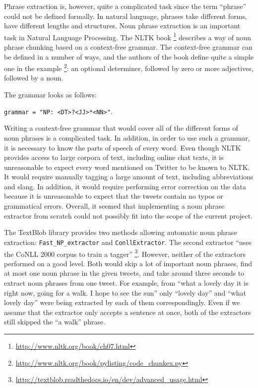 Phrase extraction is, however, quite a complicated task since the term ``phrase'' could not be defined formally. In natural language, phrases take different forms, have different lengths and structures. Noun phrase extraction is an important task in Natural Language Processing. The NLTK book \footnote{\url{http://www.nltk.org/book/ch07.html}} describes a way of noun phrase chunking based on a context-free grammar. The context-free grammar can be defined in a number of ways, and the authors of the book define quite a simple one in the example \footnote{\url{http://www.nltk.org/book/pylisting/code_chunkex.py}}: 
an optional determiner, followed by zero or more adjectives, followed by a noun. 

The grammar looks as follows: 

\texttt{grammar = "NP: {<DT>?<JJ>*<NN>}"}. 

Writing a context-free grammar that would cover all of the different forms of noun phrases is a complicated task. In addition, in order to use such a grammar, it is necessary to know the parts of speech of every word. Even though NLTK provides access to large corpora of text, including online chat texts, it is unreasonable to expect every word mentioned on Twitter to be known to NLTK. It would require manually tagging a large amount of text, including abbreviations and slang. In addition, it would require performing error correction on the data because it is unreasonable to expect that the tweets contain no typos or grammatical errors. Overall, it seemed that implementing a noun phrase extractor from scratch could not possibly fit into the scope of the current project.

The TextBlob library provides two methods allowing automatic noun phrase extraction: \texttt{Fast\_NP\_extractor} and \texttt{ConllExtractor}. The second extractor ``uses the CoNLL 2000 corpus to train a tagger'' \footnote{\url{http://textblob.readthedocs.io/en/dev/advanced_usage.html}}. However, neither of the extractors performed on a good level. Both would skip a lot of important noun phrases, find at most one noun phrase in the given tweets, and take around three seconds to extract noun phrases from one tweet. For example, from ``what a lovely day it is right now, going for a walk. I hope to see the sun'' only ``lovely day'' and ``what lovely day'' were being extracted by each of them correspondingly. Even if we assume that the extractor only accepts a sentence at once, both of the extractors still skipped the ``a walk'' phrase.

